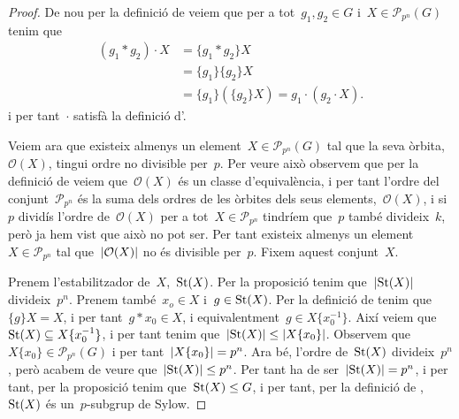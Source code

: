 \documentclass[../../main.tex]{subfiles}
\begin{document}
\begin{theorem}
\begin{proof}
            De nou per la definició de  veiem que per a tot~\(g_{1},g_{2}\in G\) i~\(X\in\mathcal{P}_{p^{n}}(G)\) tenim que \begin{align*}
            (g_{1}\ast g_{2})\cdot X&=\{g_{1}\ast g_{2}\}X\\
            &=\{g_{1}\}\{g_{2}\}X\\
            &=\{g_{1}\}(\{g_{2}\}X)=g_{1}\cdot(g_{2}\cdot X).
            \end{align*}
            i per tant~\(\cdot\) satisfà la definició d'.

            Veiem ara que existeix almenys un element~\(X\in\mathcal{P}_{p^{n}}(G)\) tal que la seva òrbita,~\(\mathcal{O}(X)\), tingui ordre no divisible per~\(p\).
            Per veure això observem que per la definició de  veiem que~\(\mathcal{O}(X)\) és un classe d'equivalència, i per tant l'ordre del conjunt~\(\mathcal{P}_{p^{n}}\) és la suma dels ordres de les òrbites dels seus elements,~\(\mathcal{O}(X)\), i si~\(p\) dividís l'ordre de~\(\mathcal{O}(X)\) per a tot~\(X\in\mathcal{P}_{p^{n}}\) tindríem que~\(p\) també divideix~\(k\), però ja hem vist que això no pot ser.
            Per tant existeix almenys un element~\(X\in\mathcal{P}_{p^{n}}\) tal que~\(\abs{\mathcal{O}(X)}\) no és divisible per~\(p\).
            Fixem aquest conjunt~\(X\).

            Prenem l'estabilitzador de~\(X\),~\(\operatorname{St}(X)\).
            Per la proposició  tenim que~\(\abs{\St(X)}\) divideix~\(p^{n}\).
            Prenem també~\(x_{o}\in X\) i~\(g\in\operatorname{St}(X)\).
            Per la definició de  tenim que~\(\{g\}X=X\), i per tant~\(g\ast x_{0}\in X\), i equivalentment~\(g\in X\{x_{0}^{-1}\}\).
            Així veiem que~\(\operatorname{St}(X)\subseteq X\{x_{0}^{-1}\}\), i per tant tenim que~\(\abs{\St(X)}\leq\abs{X\{x_{0}\}}\).
            Observem que~\(X\{x_{0}\}\in\mathcal{P}_{p^{n}}(G)\) i per tant~\(\abs{X\{x_{0}\}}=p^{n}\).
            Ara bé, l'ordre de~\(\operatorname{St}(X)\) divideix~\(p^{n}\), però acabem de veure que~\(\abs{\St(X)}\leq p^{n}\).
            Per tant ha de ser~\(\abs{\St(X)}=p^{n}\), i per tant, per la proposició  tenim que~\(\operatorname{St}(X)\leq G\), i per tant, per la definició de ,~\(\operatorname{St}(X)\) és un~\(p\)-subgrup de Sylow.
        \end{proof}
    \end{theorem}
\end{document}
